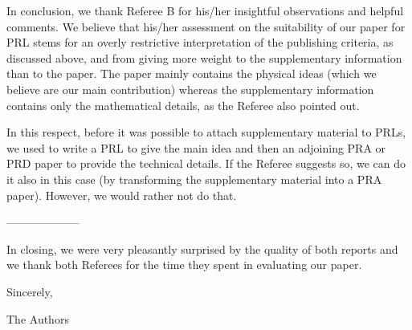 \documentclass[11pt]{article}
\begin{document}
In conclusion, we thank Referee B for his/her insightful
observations and helpful comments. We believe that his/her assessment
on the suitability of our paper for PRL stems for an overly
restrictive interpretation of the publishing criteria, as discussed
above, and from giving more weight to the supplementary information
than to the paper. The paper mainly contains the physical ideas (which
we believe are our main contribution) whereas the supplementary
information contains only the mathematical details, as the Referee
also pointed out.

In this respect, before it was possible to attach supplementary
material to PRLs, we used to write a PRL to give the main idea and
then an adjoining PRA or PRD paper to provide the technical
details. If the Referee suggests so, we can do it also in this case
(by transforming the supplementary material into a PRA
paper). However, we would rather not do that.

--------------------


In closing, we were very pleasantly surprised by the quality of both
reports and we thank both Referees for the time they spent in
evaluating our paper.

Sincerely,

The Authors
\end{document}
